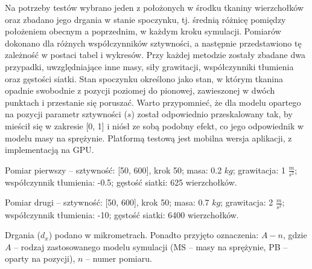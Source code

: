 		Na potrzeby testów wybrano jeden z położonych w środku tkaniny wierzchołków oraz zbadano jego drgania w stanie spoczynku, tj. średnią różnicę pomiędzy położeniem obecnym a poprzednim, w każdym kroku symulacji. Pomiarów dokonano dla różnych współczynników sztywności, a następnie przedstawiono tę zależność w postaci tabel i wykresów. Przy każdej metodzie zostały zbadane dwa przypadki, uwzględniające inne masy, siły grawitacji, współczynniki tłumienia oraz gęstości siatki. Stan spoczynku określono jako stan, w którym tkanina opadnie swobodnie z pozycji poziomej do pionowej, zawieszonej w dwóch punktach i przestanie się poruszać. Warto przypomnieć, że dla modelu opartego na pozycji parametr sztywności (\(s\)) został odpowiednio przeskalowany tak, by mieścił się w zakresie [0, 1] i niósł ze sobą podobny efekt, co jego odpowiednik w modelu masy na sprężynie. Platformą testową jest mobilna wersja aplikacji, z implementacją na GPU.
		\newline
		
		Pomiar pierwszy -- sztywność: [50, 600], krok 50; masa: 0.2 \(kg\); grawitacja: 1 \(\frac{m}{s^2}\); współczynnik tłumienia: -0.5; gęstość siatki: 625 wierzchołków.
		
		Pomiar drugi -- sztywność: [50, 600], krok 50; masa: 0.7 \(kg\); grawitacja: 2 \(\frac{m}{s^2}\); współczynnik tłumienia: -10; gęstość siatki: 6400 wierzchołków.
		\newline
		
		Drgania (\(d_{x}\)) podano w mikrometrach. Ponadto przyjęto oznaczenia: \(A-n\), gdzie \(A\) -- rodzaj zastosowanego modelu symulacji (MS -- masy na sprężynie, PB -- oparty na pozycji), \(n\) -- numer pomiaru.
		\newline
		
		
		\pagebreak
		
